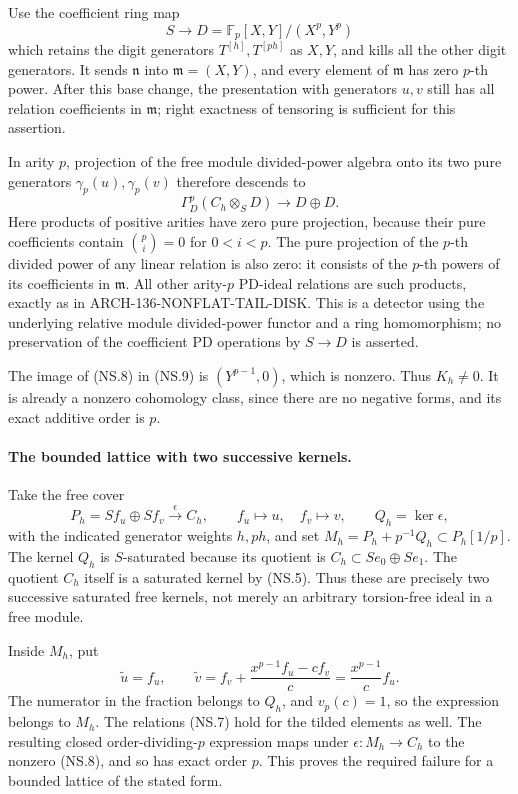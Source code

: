 Use the coefficient ring map
\[
 S\longrightarrow D=\mathbb F_p[X,Y]/(X^p,Y^p)
\]
which retains the digit generators \(T^{[h]},T^{[ph]}\)
as \(X,Y\), and kills all the other digit generators.
It sends \(\mathfrak n\) into \(\mathfrak m=(X,Y)\),
and every element of \(\mathfrak m\) has zero \(p\)-th power.
After this base change, the presentation with generators
\(u,v\) still has all relation coefficients in
\(\mathfrak m\); right exactness of tensoring is sufficient
for this assertion.

In arity \(p\), projection of the free module divided-power
algebra onto its two pure generators \(\gamma_p(u),\gamma_p(v)\)
therefore descends to
\[
                   \Gamma_D^p(C_h\otimes_S D)
                                   \longrightarrow D\oplus D.
                                                               \tag{NS.9}
\]
Here products of positive arities have zero pure projection,
because their pure coefficients contain \(\binom pi=0\)
for \(0<i<p\). The pure projection of the \(p\)-th divided
power of any linear relation is also zero: it consists of
the \(p\)-th powers of its coefficients in \(\mathfrak m\).
All other arity-\(p\) PD-ideal relations are such products,
exactly as in ARCH-136-NONFLAT-TAIL-DISK.
This is a detector using the underlying relative module
divided-power functor and a ring homomorphism; no preservation
of the coefficient PD operations by \(S\to D\) is asserted.

The image of (NS.8) in (NS.9) is
\((Y^{p-1},0)\), which is nonzero. Thus \(K_h\neq0\).
It is already a nonzero cohomology class, since there are no
negative forms, and its exact additive order is \(p\).

\paragraph{The bounded lattice with two successive kernels.}
Take the free cover
\[
 P_h=S f_u\oplus S f_v\xrightarrow{\epsilon}C_h,
 \qquad f_u\mapsto u,\quad f_v\mapsto v,
 \qquad Q_h=\ker\epsilon,
\]
with the indicated generator weights \(h,ph\), and set
\(M_h=P_h+p^{-1}Q_h\subset P_h[1/p]\).
The kernel \(Q_h\) is \(S\)-saturated because its quotient
is \(C_h\subset S e_0\oplus S e_1\).
The quotient \(C_h\) itself is a saturated kernel by (NS.5).
Thus these are precisely two successive saturated free kernels,
not merely an arbitrary torsion-free ideal in a free module.

Inside \(M_h\), put
\[
 \widetilde u=f_u,
 \qquad
 \widetilde v=f_v+
             \frac{x^{p-1}f_u-c f_v}{c}
             =\frac{x^{p-1}}c f_u .                     \tag{NS.10}
\]
The numerator in the fraction belongs to \(Q_h\), and
\(v_p(c)=1\), so the expression belongs to \(M_h\).
The relations (NS.7) hold for the tilded elements as well.
The resulting closed order-dividing-\(p\) expression maps
under \(\epsilon:M_h\to C_h\) to the nonzero (NS.8),
and so has exact order \(p\). This proves the required
failure for a bounded lattice of the stated form.

